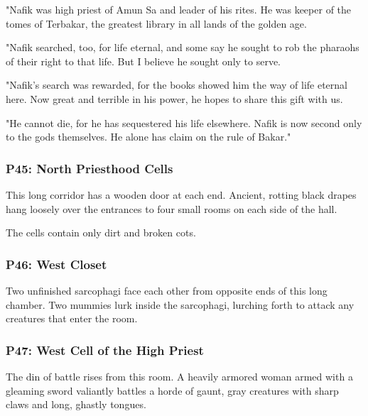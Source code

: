 \documentclass[10pt,a4paper,twoside,bg=print,twocolumn,openany,nodeprecatedcode]{dndbook}
\begin{document}
\begin{DndReadAloud}{}
"Nafik was high priest of Amun Sa and leader of his rites. He was keeper of the tomes of Terbakar, the greatest library in all lands of the golden age.

"Nafik searched, too, for life eternal, and some say he sought to rob the pharaohs of their right to that life. But I believe he sought only to serve.

"Nafik's search was rewarded, for the books showed him the way of life eternal here. Now great and terrible in his power, he hopes to share this gift with us.

"He cannot die, for he has sequestered his life elsewhere. Nafik is now second only to the gods themselves. He alone has claim on the rule of Bakar."

\end{DndReadAloud}

\subsubsection{P45: North Priesthood Cells}
\begin{DndReadAloud}{}
This long corridor has a wooden door at each end. Ancient, rotting black drapes hang loosely over the entrances to four small rooms on each side of the hall.

\end{DndReadAloud}

The cells contain only dirt and broken cots.

\subsubsection{P46: West Closet}
Two unfinished sarcophagi face each other from opposite ends of this long chamber. Two mummies lurk inside the sarcophagi, lurching forth to attack any creatures that enter the room.

\subsubsection{P47: West Cell of the High Priest}
\begin{DndReadAloud}{}
The din of battle rises from this room. A heavily armored woman armed with a gleaming sword valiantly battles a horde of gaunt, gray creatures with sharp claws and long, ghastly tongues.

\end{DndReadAloud}
\end{document}
